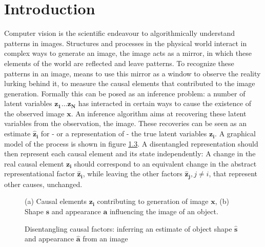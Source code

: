 \chapter{Introduction}
	Computer vision is the scientific endeavour to algorithmically understand patterns in images. Structures and processes in the physical world interact in complex ways to generate an image, the image acts as a mirror, in which these elements of the world are reflected and leave patterns.
	To recognize these patterns in an image, means to use this mirror as a window to observe the reality lurking behind it, \ie to measure the causal elements that contributed to the image generation.
	Formally this can be posed as an inference problem: a number of latent variables $\mathbf{z_1}\ldots\mathbf{z_N}$ has interacted in certain ways to cause the existence of the observed image $\mathbf{x}$. An inference algorithm aims at recovering these latent variables from the observation, \ie the image. These recoveries can be seen as an estimate $\mathbf{\hat z_i}$ for - or a representation of - the true latent variables $\mathbf{z_i}$. A graphical model of the process is shown in figure \ref{fig:causal}.
	A disentangled representation should then represent each causal element and its state independently: A change in the real causal element $\mathbf{z_i}$ should correspond to an equivalent change in the abstract representational factor $\mathbf{\hat z_i}$, while leaving the other factors $\mathbf{\hat z_j}, j\neq i$, that represent other causes, unchanged.

	\begin{figure}[t]
		\begin{subfigure}{0.49\linewidth}
			\centering
			
			\caption{}
			\label{fig:s1}
		\end{subfigure}
		\begin{subfigure}{0.49\linewidth}
			\centering
			
			\caption{}
			\label{fig:s2}
		\end{subfigure}
		\caption{(a) Causal elements $\mathbf{z_i}$ contributing to generation of image $\mathbf{x}$, (b) Shape $\mathbf{s}$ and appearance $\mathbf{a}$ influencing the image of an object.}
		\label{fig:causal}
	\end{figure}

	\begin{figure}[t]
		\centering
		
		\caption{Disentangling causal factors: \eg inferring an estimate of object shape $\mathbf{\hat s}$ and appearance $\mathbf{\hat a}$ from an image}
		\label{fig:infer}
	\end{figure}


